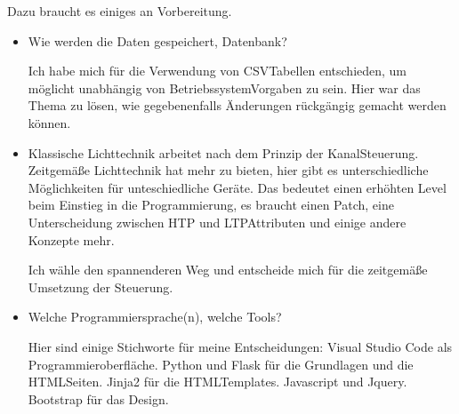 \documentclass[letterpaper,10pt,ngerman]{sphinxmanual}
\begin{document}
Dazu braucht es einiges an Vorbereitung.
\begin{itemize}
\item {} 
Wie werden die Daten gespeichert, Datenbank?

Ich habe mich für die Verwendung von CSV\sphinxhyphen{}Tabellen entschieden, um möglicht
unabhängig von Betriebssystem\sphinxhyphen{}Vorgaben zu sein. Hier war das Thema zu
lösen, wie gegebenenfalls Änderungen rückgängig gemacht werden können.

\item {} 
Klassische Lichttechnik arbeitet nach dem Prinzip der Kanal\sphinxhyphen{}Steuerung.
Zeitgemäße Lichttechnik hat mehr zu bieten, hier gibt es
unterschiedliche Möglichkeiten für unteschiedliche Geräte. Das
bedeutet einen erhöhten Level beim Einstieg in die Programmierung,
es braucht einen Patch, eine Unterscheidung zwischen HTP\sphinxhyphen{} und LTP\sphinxhyphen{}Attributen
und einige andere Konzepte mehr.

Ich wähle den spannenderen Weg und entscheide mich für die zeitgemäße
Umsetzung der Steuerung.

\item {} 
Welche Programmiersprache(n), welche Tools?

Hier sind einige Stichworte für meine Entscheidungen:
Visual Studio Code als Programmieroberfläche.
Python und Flask für die Grundlagen und die HTML\sphinxhyphen{}Seiten.
Jinja2 für die HTML\sphinxhyphen{}Templates.
Javascript und Jquery.
Bootstrap für das Design.

\end{itemize}
\end{document}
